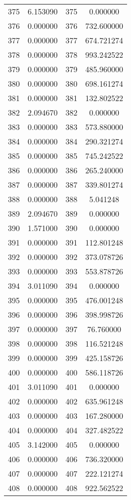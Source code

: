\documentclass[12pt]{article}
\begin{document}
\begin{longtable}{@{}cccc@{}}
375 & 6.153090 & 375 & 0.000000 \\
376 & 0.000000 & 376 & 732.600000 \\
377 & 0.000000 & 377 & 674.721274 \\
378 & 0.000000 & 378 & 993.242522 \\
379 & 0.000000 & 379 & 485.960000 \\
380 & 0.000000 & 380 & 698.161274 \\
381 & 0.000000 & 381 & 132.802522 \\
382 & 2.094670 & 382 & 0.000000 \\
383 & 0.000000 & 383 & 573.880000 \\
384 & 0.000000 & 384 & 290.321274 \\
385 & 0.000000 & 385 & 745.242522 \\
386 & 0.000000 & 386 & 265.240000 \\
387 & 0.000000 & 387 & 339.801274 \\
388 & 0.000000 & 388 & 5.041248 \\
389 & 2.094670 & 389 & 0.000000 \\
390 & 1.571000 & 390 & 0.000000 \\
391 & 0.000000 & 391 & 112.801248 \\
392 & 0.000000 & 392 & 373.078726 \\
393 & 0.000000 & 393 & 553.878726 \\
394 & 3.011090 & 394 & 0.000000 \\
395 & 0.000000 & 395 & 476.001248 \\
396 & 0.000000 & 396 & 398.998726 \\
397 & 0.000000 & 397 & 76.760000 \\
398 & 0.000000 & 398 & 116.521248 \\
399 & 0.000000 & 399 & 425.158726 \\
400 & 0.000000 & 400 & 586.118726 \\
401 & 3.011090 & 401 & 0.000000 \\
402 & 0.000000 & 402 & 635.961248 \\
403 & 0.000000 & 403 & 167.280000 \\
404 & 0.000000 & 404 & 327.482522 \\
405 & 3.142000 & 405 & 0.000000 \\
406 & 0.000000 & 406 & 736.320000 \\
407 & 0.000000 & 407 & 222.121274 \\
408 & 0.000000 & 408 & 922.562522 \\

\end{longtable}
\end{document}
